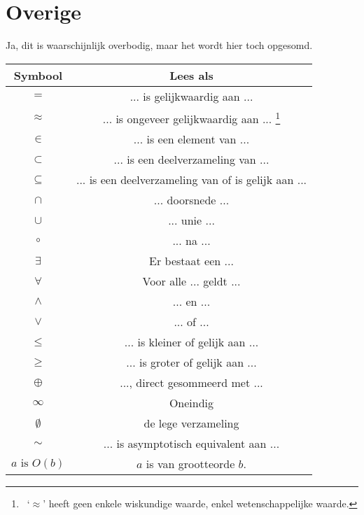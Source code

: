 \documentclass[lineaire_algebra_oplossingen.tex]{subfiles}
\begin{document}
\section{Overige}
Ja, dit is waarschijnlijk overbodig, maar het wordt hier toch opgesomd.
\begin{center}
\begin{savenotes}
\begin{tabular}{| c | c |}
\hline
Symbool & Lees als\\
\hline
$=$ & ... is gelijkwaardig aan ...\\
$\approx$ & ... is ongeveer gelijkwaardig aan ... \footnote{\ `$\approx$' heeft geen enkele wiskundige waarde, enkel wetenschappelijke waarde.}\\
$\in$ & ... is een element van ...\\
$\subset$ & ... is een deelverzameling van ...\\
$\subseteq$ & ... is een deelverzameling van of is gelijk aan ...\\
$\cap$ & ... doorsnede ...\\
$\cup$ & ... unie ...\\
$\circ$ & ... na ...\\
$\exists$ & Er bestaat een ...\\
$\forall$ & Voor alle ... geldt ...\\
$\wedge$ & ... en ...\\
$\vee$ & ... of ...\\
$\leq$ & ... is kleiner of gelijk aan ...\\
$\geq$ & ... is groter of gelijk aan ...\\
$\oplus$ & ..., direct gesommeerd met ...\\
$\infty$ & Oneindig\\
$\emptyset$ & de lege verzameling\\
$\sim$ & ... is asymptotisch equivalent aan ...\\
$a \text{ is } O(b)$ & $a$ is van grootteorde $b$.\\
\hline
\end{tabular}
\end{savenotes}
\end{center}
\end{document}
